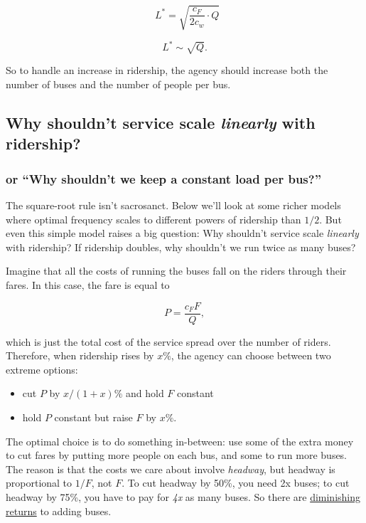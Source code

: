 \documentclass[11pt]{article}
\providecommand{\tightlist}{%
      \setlength{\itemsep}{0pt}\setlength{\parskip}{0pt}}
\begin{document}
\[\,\,\, L^* = \sqrt{\frac{c_F}{2c_w}\cdot Q} \]

\[ L^* \sim \sqrt{Q}.\]

So to handle an increase in ridership, the agency should increase both
the number of buses and the number of people per bus.

    \subsection{\texorpdfstring{Why shouldn't service scale \emph{linearly}
with
ridership?}{Why shouldn't service scale linearly with ridership?}}\label{why-shouldnt-service-scale-linearly-with-ridership}

\subsubsection{\texorpdfstring{or ``Why shouldn't we keep a constant
load per
bus?''}{or Why shouldn't we keep a constant load per bus?}}\label{or-why-shouldnt-we-keep-a-constant-load-per-bus}

The square-root rule isn't sacrosanct. Below we'll look at some richer
models where optimal frequency scales to different powers of ridership
than \(1/2\). But even this simple model raises a big question: Why
shouldn't service scale \emph{linearly} with ridership? If ridership
doubles, why shouldn't we run twice as many buses?

Imagine that all the costs of running the buses fall on the riders
through their fares. In this case, the fare is equal to

\[
P = \frac{c_FF}{Q},
\]

which is just the total cost of the service spread over the number of
riders. Therefore, when ridership rises by \(x\%\), the agency can
choose between two extreme options:

\begin{itemize}
\tightlist
\item
  cut \(P\) by \(x/(1+x)\%\) and hold \(F\) constant
\item
  hold \(P\) constant but raise \(F\) by \(x\%\).
\end{itemize}

The optimal choice is to do something in-between: use some of the extra
money to cut fares by putting more people on each bus, and some to run
more buses. The reason is that the costs we care about involve
\emph{headway}, but headway is proportional to \(1/F\), not \(F\). To
cut headway by 50\%, you need 2x buses; to cut headway by 75\%, you have
to pay for \emph{4x} as many buses. So there are
\href{https://en.wikipedia.org/wiki/Diminishing_returns}{diminishing
returns} to adding buses.
\end{document}

